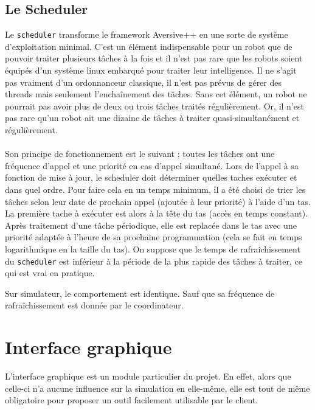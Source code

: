 \subsection{Le Scheduler}
Le \texttt{scheduler} transforme le framework Aversive++ en une sorte de système d'exploitation minimal. C'est un élément indispensable pour un robot que de pouvoir traiter plusieurs tâches à la fois et il n'est pas rare que les robots soient équipés d'un système linux embarqué pour traiter leur intelligence. Il ne s'agit pas vraiment d'un ordonnanceur classique, il n'est pas prévus de gérer des threads mais seulement l'enchaînement des tâches. Sans cet élément, un robot ne pourrait pas avoir plus de deux ou trois tâches traités régulièrement. Or, il n'est pas rare qu'un robot ait une dizaine de tâches à traiter quasi-simultanément et régulièrement. 

\paragraph{}
Son principe de fonctionnement est le suivant : toutes les tâches ont une fréquence d'appel et une priorité en cas d'appel simultané. Lors de l'appel à sa fonction de mise à jour, le scheduler doit déterminer quelles taches exécuter et dans quel ordre. Pour faire cela en un temps minimum, il a été choisi de trier les tâches selon leur date de prochain appel (ajoutée à leur priorité) à l'aide d'un tas. La première tache à exécuter est alors à la tête du tas (accès en temps constant). Après traitement d'une tâche périodique, elle est replacée dans le tas avec une priorité adaptée à l'heure de sa prochaine programmation (cela se fait en temps logarithmique en la taille du tas). On suppose que le temps de rafraichissement du \texttt{scheduler} est inférieur à la période de la plus rapide des tâches à traiter, ce qui est vrai en pratique.

Sur simulateur, le comportement est identique. Sauf que sa fréquence de rafraîchissement est donnée par le coordinateur.


\section{Interface graphique}

L'interface graphique est un module particulier du projet. En effet, alors que celle-ci n'a aucune influence sur la simulation en elle-même, elle est tout de même obligatoire pour proposer un outil facilement utilisable par le client.

